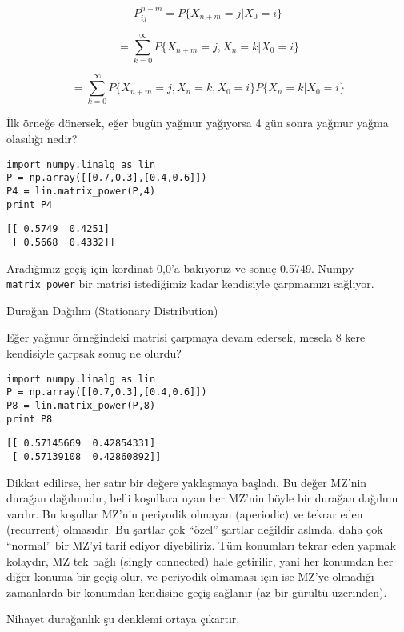 \documentclass[12pt,fleqn]{article}\usepackage{../../common}
\begin{document}
$$
P_{ij}^{n+m} = P\{X_{n+m} = j | X_0 = i \}
$$

$$
= \sum_{k=0}^{\infty} P\{X_{n+m} = j, X_n = k | X_0 = i \}
$$

$$
= \sum_{k=0}^{\infty} P\{X_{n+m} = j, X_n = k, X_0 = i \}
P\{X_n=k|X_0=i\}
$$



İlk örneğe dönersek, eğer bugün yağmur yağıyorsa 4 gün sonra yağmur yağma
olasılığı nedir?

\begin{verbatim}
import numpy.linalg as lin
P = np.array([[0.7,0.3],[0.4,0.6]])
P4 = lin.matrix_power(P,4)
print P4
\end{verbatim}

\begin{verbatim}
[[ 0.5749  0.4251]
 [ 0.5668  0.4332]]
\end{verbatim}

Aradığımız geçiş için kordinat 0,0'a bakıyoruz ve sonuç 0.5749. Numpy
\verb!matrix_power! bir matrisi istediğimiz kadar kendisiyle çarpmamızı
sağlıyor. 

Durağan Dağılım (Stationary Distribution)

Eğer yağmur örneğindeki matrisi çarpmaya devam edersek, mesela 8 kere
kendisiyle çarpsak sonuç ne olurdu? 

\begin{verbatim}
import numpy.linalg as lin
P = np.array([[0.7,0.3],[0.4,0.6]])
P8 = lin.matrix_power(P,8)
print P8
\end{verbatim}

\begin{verbatim}
[[ 0.57145669  0.42854331]
 [ 0.57139108  0.42860892]]
\end{verbatim}

Dikkat edilirse, her satır bir değere yaklaşmaya başladı. Bu değer MZ'nin
durağan dağılımıdır, belli koşullara uyan her MZ'nin böyle bir durağan
dağılımı vardır. Bu koşullar MZ'nin periyodik olmayan (aperiodic) ve tekrar
eden (recurrent) olmasıdır. Bu şartlar çok ``özel'' şartlar değildir
aslında, daha çok ``normal'' bir MZ'yi tarif ediyor diyebiliriz. Tüm
konumları tekrar eden yapmak kolaydır, MZ tek bağlı (singly connected) hale
getirilir, yani her konumdan her diğer konuma bir geçiş olur, ve periyodik
olmaması için ise MZ'ye olmadığı zamanlarda bir konumdan kendisine geçiş
sağlanır (az bir gürültü üzerinden). 

Nihayet durağanlık şu denklemi ortaya çıkartır,
\end{document}
